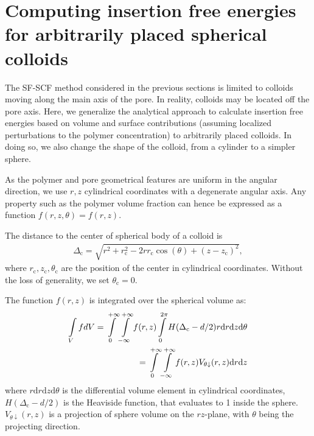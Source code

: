 \documentclass[10pt, a4paper, twocolumn]{article}
\begin{document}
\pagebreak
\section{Computing insertion free energies for arbitrarily placed spherical colloids}

The SF-SCF method considered in the previous sections is limited to colloids moving along the main axis of the pore.
In reality, colloids may be located off the pore axis.
Here, we generalize the analytical approach to calculate insertion free energies based on volume and surface contributions (assuming localized perturbations to the polymer concentration) to arbitrarily placed colloids.
In doing so, we also change the shape of the colloid, from a cylinder to a simpler sphere.

As the polymer and pore geometrical features are uniform in the angular direction, we use $r, z$ cylindrical coordinates with a degenerate angular axis.
Any property such as the polymer volume fraction can hence be expressed as a function $f(r,z,\theta) = f(r,z)$.

The distance to the center of spherical body of a colloid is 
\begin{eqnarray}
\Delta_{\text{c}} = \sqrt{r^2 + r_{\text{c}}^2 - 2 r r_{\text{c}} \cos(\theta) + (z - z_{\text{c}})^2},
\end{eqnarray} 
where $r_{\text{c}}, z_{\text{c}}, \theta_{\text{c}}$ are the position of the center in cylindrical coordinates.
Without the loss of generality, we set $\theta_{\text{c}} = 0$.

The function $f(r,z)$ is integrated over the spherical volume as:
\begin{eqnarray}
    \label{eq:int_indicator_V}
    \begin{aligned}
        \int\limits_{V} f dV
        =\int\displaylimits_{0}^{+\infty} \int\displaylimits_{-\infty}^{+\infty} f(r, z) \int\displaylimits_{0}^{2\pi}  H(\Delta_{\text{c}} - d/2) r \text{d}r \text{d}z \text{d}\theta \\
        =\int\displaylimits_{0}^{+\infty} \int\displaylimits_{-\infty}^{+\infty} f(r, z)  V_{\theta \downarrow}(r,z) \text{d}r \text{d}z
    \end{aligned}
\end{eqnarray}
where $r \text{d}r \text{d}z \text{d}\theta$ is the differential volume element in cylindrical coordinates, $H(\Delta_{\text{c}} - d/2)$ is the Heaviside function, that evaluates to 1 inside the sphere.
$V_{\theta \downarrow}(r,z)$ is a projection of sphere volume on the $rz$-plane, with $\theta$ being the projecting direction.
\end{document}
